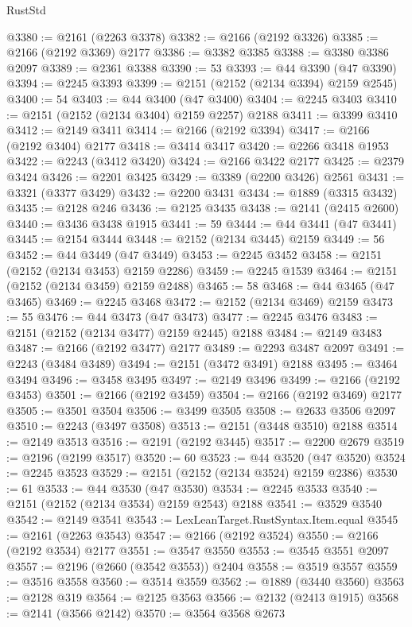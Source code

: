 \begin{lexlean}{RustStd}
\begin{coremodule}
@3380 := @2161 (@2263 @3378)
@3382 := @2166 (@2192 @3326)
@3385 := @2166 (@2192 @3369) @2177
@3386 := @3382 @3385
@3388 := @3380 @3386 @2097
@3389 := @2361 @3388
@3390 := 53
@3393 := @44 @3390 (@47 @3390)
@3394 := @2245 @3393
@3399 := @2151 (@2152 (@2134 @3394) @2159 @2545)
@3400 := 54
@3403 := @44 @3400 (@47 @3400)
@3404 := @2245 @3403
@3410 := @2151 (@2152 (@2134 @3404) @2159 @2257) @2188
@3411 := @3399 @3410
@3412 := @2149 @3411
@3414 := @2166 (@2192 @3394)
@3417 := @2166 (@2192 @3404) @2177
@3418 := @3414 @3417
@3420 := @2266 @3418 @1953
@3422 := @2243 (@3412 @3420)
@3424 := @2166 @3422 @2177
@3425 := @2379 @3424
@3426 := @2201 @3425
@3429 := @3389 (@2200 @3426) @2561
@3431 := @3321 (@3377 @3429)
@3432 := @2200 @3431
@3434 := @1889 (@3315 @3432)
@3435 := @2128 @246
@3436 := @2125 @3435
@3438 := @2141 (@2415 @2600)
@3440 := @3436 @3438 @1915
@3441 := 59
@3444 := @44 @3441 (@47 @3441)
@3445 := @2154 @3444
@3448 := @2152 (@2134 @3445) @2159
@3449 := 56
@3452 := @44 @3449 (@47 @3449)
@3453 := @2245 @3452
@3458 := @2151 (@2152 (@2134 @3453) @2159 @2286)
@3459 := @2245 @1539
@3464 := @2151 (@2152 (@2134 @3459) @2159 @2488)
@3465 := 58
@3468 := @44 @3465 (@47 @3465)
@3469 := @2245 @3468
@3472 := @2152 (@2134 @3469) @2159
@3473 := 55
@3476 := @44 @3473 (@47 @3473)
@3477 := @2245 @3476
@3483 := @2151 (@2152 (@2134 @3477) @2159 @2445) @2188
@3484 := @2149 @3483
@3487 := @2166 (@2192 @3477) @2177
@3489 := @2293 @3487 @2097
@3491 := @2243 (@3484 @3489)
@3494 := @2151 (@3472 @3491) @2188
@3495 := @3464 @3494
@3496 := @3458 @3495
@3497 := @2149 @3496
@3499 := @2166 (@2192 @3453)
@3501 := @2166 (@2192 @3459)
@3504 := @2166 (@2192 @3469) @2177
@3505 := @3501 @3504
@3506 := @3499 @3505
@3508 := @2633 @3506 @2097
@3510 := @2243 (@3497 @3508)
@3513 := @2151 (@3448 @3510) @2188
@3514 := @2149 @3513
@3516 := @2191 (@2192 @3445)
@3517 := @2200 @2679
@3519 := @2196 (@2199 @3517)
@3520 := 60
@3523 := @44 @3520 (@47 @3520)
@3524 := @2245 @3523
@3529 := @2151 (@2152 (@2134 @3524) @2159 @2386)
@3530 := 61
@3533 := @44 @3530 (@47 @3530)
@3534 := @2245 @3533
@3540 := @2151 (@2152 (@2134 @3534) @2159 @2543) @2188
@3541 := @3529 @3540
@3542 := @2149 @3541
@3543 := LexLeanTarget.RustSyntax.Item.equal
@3545 := @2161 (@2263 @3543)
@3547 := @2166 (@2192 @3524)
@3550 := @2166 (@2192 @3534) @2177
@3551 := @3547 @3550
@3553 := @3545 @3551 @2097
@3557 := @2196 (@2660 (@3542 @3553)) @2404
@3558 := @3519 @3557
@3559 := @3516 @3558
@3560 := @3514 @3559
@3562 := @1889 (@3440 @3560)
@3563 := @2128 @319
@3564 := @2125 @3563
@3566 := @2132 (@2413 @1915)
@3568 := @2141 (@3566 @2142)
@3570 := @3564 @3568 @2673

\end{coremodule}
\end{lexlean}
